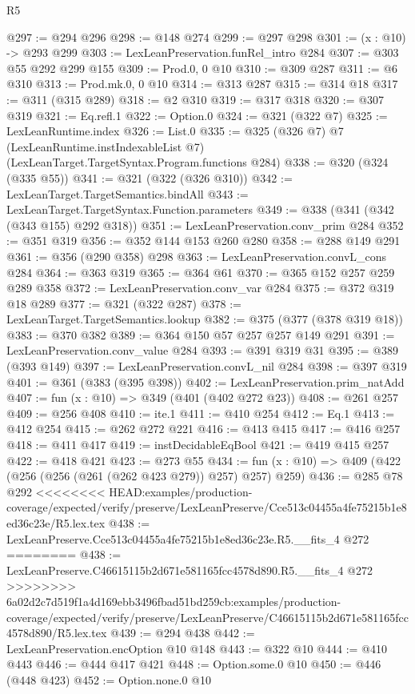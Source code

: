 \begin{lexlean}{R5}
\begin{coremodule}
{{{{{{{{{@297 := @294 @296
@298 := @148 @274
@299 := @297 @298
@301 := (x : @10) -> @293 @299
@303 := LexLeanPreservation.funRel_intro @284
@307 := @303 @55 @292 @299 @155
@309 := Prod.{0, 0} @10
@310 := @309 @287
@311 := @6 @310
@313 := Prod.mk.{0, 0} @10
@314 := @313 @287
@315 := @314 @18
@317 := @311 (@315 @289)
@318 := @2 @310
@319 := @317 @318
@320 := @307 @319
@321 := Eq.refl.{1}
@322 := Option.{0}
@324 := @321 (@322 @7)
@325 := LexLeanRuntime.index
@326 := List.{0}
@335 := @325
    (@326 @7)
    @7
    (LexLeanRuntime.instIndexableList @7)
    (LexLeanTarget.TargetSyntax.Program.functions @284)
@338 := @320 (@324 (@335 @55))
@341 := @321 (@322 (@326 @310))
@342 := LexLeanTarget.TargetSemantics.bindAll
@343 := LexLeanTarget.TargetSyntax.Function.parameters
@349 := @338 (@341 (@342 (@343 @155) @292 @318))
@351 := LexLeanPreservation.conv_prim @284
@352 := @351 @319
@356 := @352 @144 @153 @260 @280
@358 := @288 @149 @291
@361 := @356 (@290 @358) @298
@363 := LexLeanPreservation.convL_cons @284
@364 := @363 @319
@365 := @364 @61
@370 := @365 @152 @257 @259 @289 @358
@372 := LexLeanPreservation.conv_var @284
@375 := @372 @319 @18 @289
@377 := @321 (@322 @287)
@378 := LexLeanTarget.TargetSemantics.lookup
@382 := @375 (@377 (@378 @319 @18))
@383 := @370 @382
@389 := @364 @150 @57 @257 @257 @149 @291
@391 := LexLeanPreservation.conv_value @284
@393 := @391 @319 @31
@395 := @389 (@393 @149)
@397 := LexLeanPreservation.convL_nil @284
@398 := @397 @319
@401 := @361 (@383 (@395 @398))
@402 := LexLeanPreservation.prim_natAdd
@407 := fun (x : @10) => @349 (@401 (@402 @272 @23))
@408 := @261 @257
@409 := @256 @408
@410 := ite.{1}
@411 := @410 @254
@412 := Eq.{1}
@413 := @412 @254
@415 := @262 @272 @221
@416 := @413 @415
@417 := @416 @257
@418 := @411 @417
@419 := instDecidableEqBool
@421 := @419 @415 @257
@422 := @418 @421
@423 := @273 @55
@434 := fun (x : @10) => @409 (@422 (@256 (@256 (@261 (@262 @423 @279)) @257) @257) @259)
@436 := @285 @78 @292
<<<<<<<< HEAD:examples/production-coverage/expected/verify/preserve/LexLeanPreserve/Cce513c04455a4fe75215b1e8ed36c23e/R5.lex.tex
@438 := LexLeanPreserve.Cce513c04455a4fe75215b1e8ed36c23e.R5.__fits_4 @272
========
@438 := LexLeanPreserve.C46615115b2d671e581165fcc4578d890.R5.__fits_4 @272
>>>>>>>> 6a02d2c7d519f1a4d169ebb3496fbad51bd259cb:examples/production-coverage/expected/verify/preserve/LexLeanPreserve/C46615115b2d671e581165fcc4578d890/R5.lex.tex
@439 := @294 @438
@442 := LexLeanPreservation.encOption @10 @148
@443 := @322 @10
@444 := @410 @443
@446 := @444 @417 @421
@448 := Option.some.{0} @10
@450 := @446 (@448 @423)
@452 := Option.none.{0} @10
}}}}}}}}}
\end{coremodule}
\end{lexlean}
